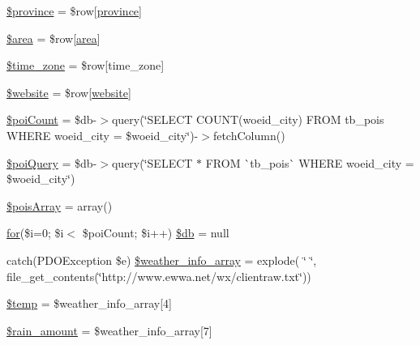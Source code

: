 \begin{DoxyCompactItemize}
\item 
\mbox{\hyperlink{hull_2index_8php_a0bdd006d1becad76055fe31c887fdfaf}{\$province}} = \$row\mbox{[}\textquotesingle{}\mbox{\hyperlink{index_8php_a38d70414c65575df5643ad4296c9db2e}{province}}\textquotesingle{}\mbox{]}
\item 
\mbox{\hyperlink{hull_2index_8php_a460a08379d150f8c151a07ad9a3251cd}{\$area}} = \$row\mbox{[}\textquotesingle{}\mbox{\hyperlink{index_8php_a5198216176428aa2303311f956213f33}{area}}\textquotesingle{}\mbox{]}
\item 
\mbox{\hyperlink{hull_2index_8php_adce4610b55a895abff73b5ed259c4bd3}{\$time\+\_\+zone}} = \$row\mbox{[}\textquotesingle{}time\+\_\+zone\textquotesingle{}\mbox{]}
\item 
\mbox{\hyperlink{hull_2index_8php_a2887d41d3bb2498db735eeb87efa2d73}{\$website}} = \$row\mbox{[}\textquotesingle{}\mbox{\hyperlink{index_8php_a8c56014cff17c1ced653aa98455da680}{website}}\textquotesingle{}\mbox{]}
\item 
\mbox{\hyperlink{hull_2index_8php_a8fb5f82500861c51c8fcfd700321e59e}{\$poi\+Count}} = \$db-\/$>$query(\char`\"{}S\+E\+L\+E\+CT C\+O\+U\+NT(woeid\+\_\+city) F\+R\+OM tb\+\_\+pois W\+H\+E\+RE woeid\+\_\+city = \$woeid\+\_\+city\char`\"{})-\/$>$fetch\+Column()
\item 
\mbox{\hyperlink{hull_2index_8php_a735d09bd88bab2d39b5d123b6a1ac7e9}{\$poi\+Query}} = \$db-\/$>$query(\char`\"{}S\+E\+L\+E\+CT $\ast$ F\+R\+OM \`{}tb\+\_\+pois\`{} W\+H\+E\+RE woeid\+\_\+city = \$woeid\+\_\+city\char`\"{})
\item 
\mbox{\hyperlink{hull_2index_8php_aba22eb823924400ba310cca9821c67b3}{\$pois\+Array}} = array()
\item 
\mbox{\hyperlink{index_8php_a2e79af1ba492bd2cbbaafa83f16262da}{for}}(\$i=0; \$i$<$ \$poi\+Count; \$i++) \mbox{\hyperlink{hull_2index_8php_ae26e87d17180fc87313d19b439092f0f}{\$db}} = null
\item 
catch(P\+D\+O\+Exception \$e) \mbox{\hyperlink{hull_2index_8php_af16b636c83a2e1d4b020917a4fc5858b}{\$weather\+\_\+info\+\_\+array}} = explode( \char`\"{} \char`\"{}, file\+\_\+get\+\_\+contents(\char`\"{}http\+://www.\+ewwa.\+net/wx/clientraw.\+txt\char`\"{}))
\item 
\mbox{\hyperlink{hull_2index_8php_a0d57fb0317e19ec798aa625381ebf342}{\$temp}} = \$weather\+\_\+info\+\_\+array\mbox{[}4\mbox{]}
\item 
\mbox{\hyperlink{hull_2index_8php_a2aa7fd45b683a3c60b6f5e5d11a027b3}{\$rain\+\_\+amount}} = \$weather\+\_\+info\+\_\+array\mbox{[}7\mbox{]}

\end{DoxyCompactItemize}
